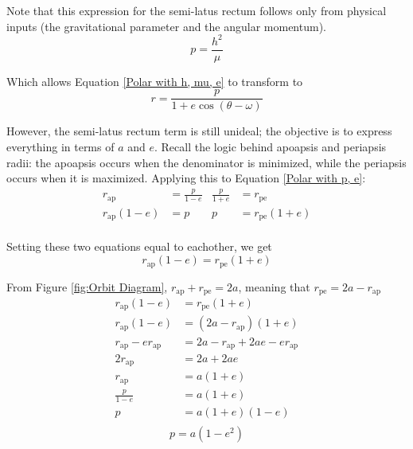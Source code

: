 \documentclass{article}
\begin{document}
Note that this expression for the semi-latus rectum follows only from physical inputs (the gravitational parameter and the angular momentum).
\begin{equation}\label{SLR h and mu}
    p=\frac{h^2}{\mu}
\end{equation}

Which allows Equation \eqref{Polar with h, mu, e} to transform to
\begin{equation}\label{Polar with p, e}
    r=\frac{p}{1+e\cos(\theta-\omega)}
\end{equation}

However, the semi-latus rectum term is still unideal; the objective is to express everything in terms of $a$ and $e$. Recall the logic behind apoapsis and periapsis radii: the apoapsis occurs when the denominator is minimized, while the periapsis occurs when it is maximized. Applying this to Equation \eqref{Polar with p, e}:
\begin{align*}
    r_\text{ap}      & =\frac{p}{1-e} & \frac{p}{1+e} & =r_\text{pe}      \\
    r_\text{ap}(1-e) & =p             & p             & =r_\text{pe}(1+e) \\
\end{align*}

Setting these two equations equal to eachother, we get
$$r_\text{ap}(1-e)=r_\text{pe}(1+e)$$

From Figure \ref{fig:Orbit Diagram}, $r_\text{ap}+r_\text{pe}=2a$, meaning that $r_\text{pe}=2a-r_\text{ap}$
\begin{align*}
    r_\text{ap}(1-e)         & =r_\text{pe}(1+e)                \\
    r_\text{ap}(1-e)         & =(2a-r_\text{ap})(1+e)           \\
    r_\text{ap}-er_\text{ap} & =2a-r_\text{ap}+2ae-er_\text{ap} \\
    2r_\text{ap}             & =2a+2ae                          \\
    r_\text{ap}              & =a(1+e)                          \\
    \frac{p}{1-e}            & =a(1+e)                          \\
    p                        & =a(1+e)(1-e)                     \\
\end{align*}
\begin{equation}\label{SLR a and e}
    p=a(1-e^2)
\end{equation}
\end{document}
